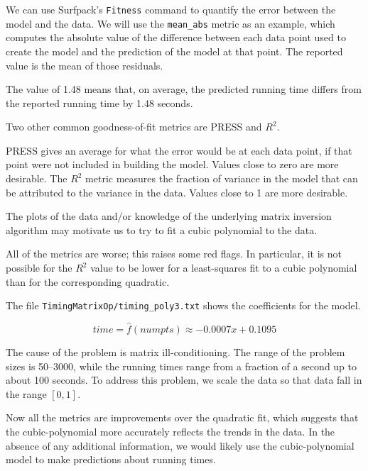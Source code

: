 \documentclass{article}
\begin{document}
We can use Surfpack's \texttt{Fitness} command to quantify the error between the model
and the data.  We will use the \texttt{mean\_abs} metric as an example, which computes
the absolute value of the difference between each data point used to create the
model and the prediction of the model at that point.  The reported value is the
mean of those residuals.


The value of 1.48 means that, on average, the predicted running time differs
from the reported running time by 1.48 seconds.  

Two other common goodness-of-fit metrics are PRESS and $R^2$.

PRESS gives an average for what the error would be at each data point, if that
point were not included in building the model.  Values close to zero are more
desirable.  The $R^2$ metric measures the fraction of variance in the model
that can be attributed to the variance in the data.  Values close to 1 are more
desirable.

The plots of the data and/or knowledge of the underlying matrix inversion
algorithm may motivate us to try to fit a cubic polynomial to the data.



All of the metrics are worse; this raises some red flags.  In particular, it is
not possible for the $R^2$ value to be lower for a least-squares fit to a
cubic polynomial than for the corresponding quadratic.

The file \texttt{TimingMatrixOp/timing\_poly3.txt} shows the coefficients for the model.




\[ time = \hat{f}(numpts) \approx - 0.0007x + 0.1095 \]

The cause of the problem is matrix ill-conditioning.  The range of the problem
sizes is 50--3000, while the running times range from a fraction of a second up
to about 100 seconds.  To address this problem, we scale the data so that data
fall in the range $[0,1]$.



Now all the metrics are improvements over the quadratic fit, which suggests that
the cubic-polynomial more accurately reflects the trends in the data.  In the
absence of any additional information, we would likely use the cubic-polynomial
model to make predictions about running times.
\end{document}
